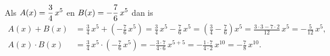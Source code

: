 \documentclass{ximera}
\begin{document}
\begin{example} 
Als \(\displaystyle A(x) = \frac{3}{4}\,x^5\) en \(\displaystyle B(x) = -\frac{7}{6}\,x^5\) dan is 
\begin{align*}
A(x) + B(x) & = \frac{3}{4}\,x^5 + \left(-\frac{7}{6}\,x^5\right) 
= \frac{3}{4}\,x^5 - \frac{7}{6}\,x^5
= \left(\frac{3}{4} - \frac{7}{6}\right)x^5 
= \frac{3 \cdot 3 - 7 \cdot 2}{12}\,x^5 
= -\frac{5}{12}\,x^5, \\
A(x) \cdot B(x) & = \frac{3}{4}\,x^5 \cdot \left(-\frac{7}{6}\,x^5\right) = - \frac{3 \cdot 7}{4 \cdot 6}\,x^{5+5} = -\frac{1\cdot 7}{4 \cdot 2}\, x^{10} = -\frac{7}{8}\,x^{10}. 
\end{align*}
\end{example}
\end{document}
